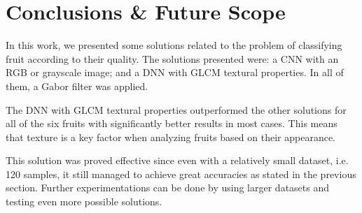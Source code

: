 \documentclass[../main.tex]{subfile}
\begin{document}
\section{Conclusions \& Future Scope} \label{sec:conclusions-&-future-scope}
    
    In this work, we presented some solutions related to the problem of classifying fruit according to their quality. The solutions presented were: a CNN with an RGB or grayscale image; and a DNN with GLCM textural properties. In all of them, a Gabor filter was applied.
    
    The DNN with GLCM textural properties outperformed the other solutions for all of the six fruits with significantly better results in most cases. This means that texture is a key factor when analyzing fruits based on their appearance.
    
    This solution was proved effective since even with a relatively small dataset, i.e. 120 samples, it still managed to achieve great accuracies as stated in the previous section. Further experimentations can be done by using larger datasets and testing even more possible solutions.
    
    
\end{document}

